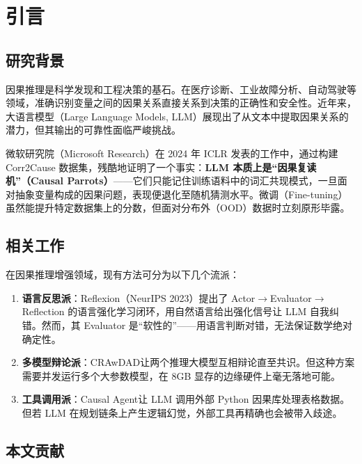 \documentclass[12pt, a4paper]{ctexart}
\begin{document}
\newpage
\tableofcontents
\newpage

\section{引言}

\subsection{研究背景}

因果推理是科学发现和工程决策的基石。在医疗诊断、工业故障分析、自动驾驶等领域，准确识别变量之间的因果关系直接关系到决策的正确性和安全性。近年来，大语言模型（Large Language Models, LLM）展现出了从文本中提取因果关系的潜力，但其输出的可靠性面临严峻挑战。

微软研究院（Microsoft Research）在 2024 年 ICLR 发表的工作\cite{msr2024}中，通过构建 Corr2Cause 数据集，残酷地证明了一个事实：\textbf{LLM 本质上是``因果复读机''（Causal Parrots）}——它们只能记住训练语料中的词汇共现模式，一旦面对抽象变量构成的因果问题，表现便退化至随机猜测水平。微调（Fine-tuning）虽然能提升特定数据集上的分数，但面对分布外（OOD）数据时立刻原形毕露。

\subsection{相关工作}

在因果推理增强领域，现有方法可分为以下几个流派：

\begin{enumerate}[label=(\arabic*)]
  \item \textbf{语言反思派}：Reflexion\cite{reflexion2023}（NeurIPS 2023）提出了 Actor$\to$Evaluator$\to$Reflection 的语言强化学习闭环，用自然语言给出强化信号让 LLM 自我纠错。然而，其 Evaluator 是``软性的''——用语言判断对错，无法保证数学绝对确定性。

  \item \textbf{多模型辩论派}：CRAwDAD\cite{crawdad2024}让两个推理大模型互相辩论直至共识。但这种方案需要并发运行多个大参数模型，在 8GB 显存的边缘硬件上毫无落地可能。

  \item \textbf{工具调用派}：Causal Agent\cite{causalagent2024}让 LLM 调用外部 Python 因果库处理表格数据。但若 LLM 在规划链条上产生逻辑幻觉，外部工具再精确也会被带入歧途。
\end{enumerate}

\subsection{本文贡献}
\end{document}
